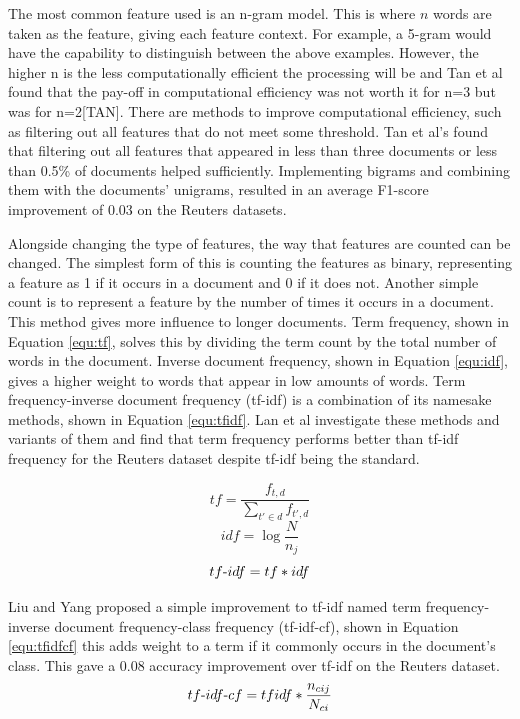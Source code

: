 			The most common feature used is an n-gram model. This is where $n$ words are taken as the feature, giving each feature context. For example, a 5-gram would have the capability to distinguish between the above examples. However, the higher n is the less computationally efficient the processing will be and Tan et al found that the pay-off in computational efficiency was not worth it for n=3 but was for n=2[TAN]. There are methods to improve computational efficiency, such as filtering out all features that do not meet some threshold. Tan et al's found that filtering out all features that appeared in less than three documents or less than 0.5\% of documents helped sufficiently. Implementing bigrams and combining them with the documents' unigrams, resulted in an average F1-score improvement of 0.03 on the Reuters datasets\cite{bigrams_enhance_categorisation}. 

			Alongside changing the type of features, the way that features are counted can be changed. The simplest form of this is counting the features as binary, representing a feature as 1 if it occurs in a document and 0 if it does not. Another simple count is to represent a feature by the number of times it occurs in a document. This method gives more influence to longer documents. Term frequency, shown in Equation \ref{equ:tf}, solves this by dividing the term count by the total number of words in the document. Inverse document frequency, shown in Equation \ref{equ:idf}, gives a higher weight to words that appear in low amounts of words. Term frequency-inverse document frequency (tf-idf) is a combination of its namesake methods, shown in Equation \ref{equ:tfidf}. Lan et al investigate these methods and variants of them and find that term frequency performs better than tf-idf frequency for the Reuters dataset despite tf-idf being the standard.
			
			\begin{equation}\label{equ:tf}
				tf = \frac{f_{t,d}}{\sum_{t' \in d}f_{t',d}} 
			\end{equation}
			\begin{equation}\label{equ:idf}
				idf = \log \frac{N}{n_j}
			\end{equation}
			\begin{equation}\label{equ:tfidf}
				tf\textnormal{-}idf = tf * idf
			\end{equation}
			
			Liu and Yang proposed a simple improvement to tf-idf named term frequency-inverse document frequency-class frequency (tf-idf-cf), shown in Equation \ref{equ:tfidfcf} this adds weight to a term if it commonly occurs in the document's class. This gave a 0.08 accuracy improvement over tf-idf on the Reuters dataset.
			\begin{equation}\label{equ:tfidfcf}
				tf\textnormal{-}idf\textnormal{-}cf = tfidf * \frac{n_{cij}}{N_{ci}}
			\end{equation}
